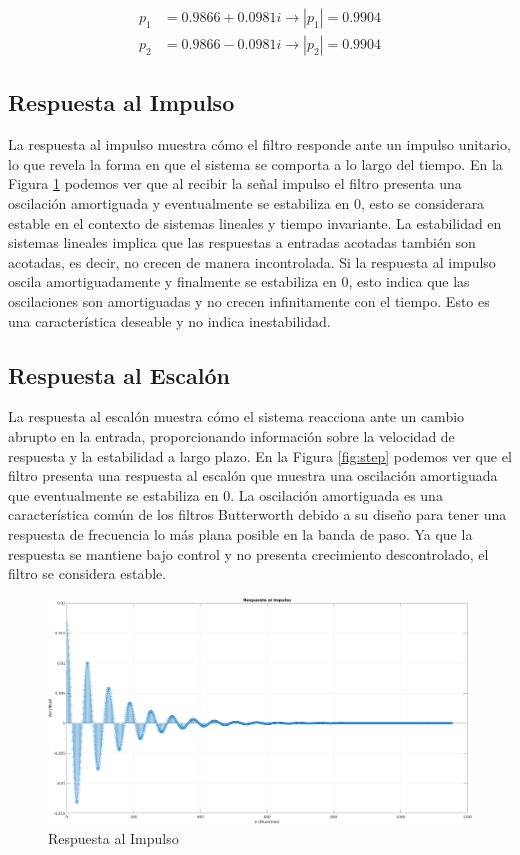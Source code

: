 \begin{align}
  p_1 & = 0.9866 + 0.0981i  \rightarrow  |p_1| = 0.9904 \label{eq:modulo_p1} \\
  p_2 & = 0.9866 - 0.0981i  \rightarrow  |p_2| = 0.9904 \label{eq:modulo_p2}
\end{align}

\subsection*{Respuesta al Impulso}
La respuesta al impulso muestra cómo el filtro responde ante un impulso unitario, lo que revela la forma en que el sistema se comporta a lo largo del tiempo. En la Figura \ref{fig:impulse} podemos ver que al recibir la señal impulso el filtro presenta una oscilación amortiguada y eventualmente se estabiliza en 0, esto se considerara estable en el contexto de sistemas lineales y tiempo invariante. La estabilidad en sistemas lineales implica que las respuestas a entradas acotadas también son acotadas, es decir, no crecen de manera incontrolada. Si la respuesta al impulso oscila amortiguadamente y finalmente se estabiliza en 0, esto indica que las oscilaciones son amortiguadas y no crecen infinitamente con el tiempo. Esto es una característica deseable y no indica inestabilidad.

\subsection*{Respuesta al Escalón}
La respuesta al escalón muestra cómo el sistema reacciona ante un cambio abrupto en la entrada, proporcionando información sobre la velocidad de respuesta y la estabilidad a largo plazo. En la Figura \ref{fig:step} podemos ver que el filtro presenta una respuesta al escalón que muestra una oscilación amortiguada que eventualmente se estabiliza en 0. La oscilación amortiguada es una característica común de los filtros Butterworth debido a su diseño para tener una respuesta de frecuencia lo más plana posible en la banda de paso. Ya que la respuesta se mantiene bajo control y no presenta crecimiento descontrolado, el filtro se considera estable.

\begin{figure}[H]
  \centering
  \includegraphics[width=\linewidth]{images/filtros-digitales/impulse.png}
  \caption{Respuesta al Impulso}
  \label{fig:impulse}
\end{figure}

